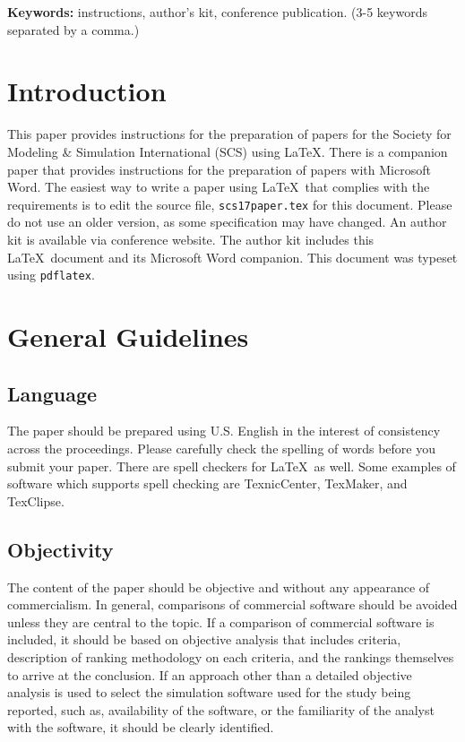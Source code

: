 \documentclass{scspaperproc}
\theoremstyle{scsthe}
\begin{document}
\textbf{Keywords:} instructions, author’s kit, conference publication. (3-5 keywords separated by a comma.)

\section{Introduction}
\label{sec:intro}

This paper provides instructions for the preparation of papers for the Society for Modeling \& Simulation International (SCS) using \LaTeX. There is a companion paper that provides instructions for the preparation of papers with Microsoft Word. The easiest way to write a paper using \LaTeX\ that complies with the requirements is to edit the source file, \texttt{scs17paper.tex} for this document. Please do not use an older version, as some specification may have changed. An author kit is available via conference website. The author kit includes this \LaTeX\ document and its Microsoft Word companion. This document was typeset using \texttt{pdflatex}.


\section{General Guidelines}

\subsection{Language}

The paper should be prepared using U.S. English in the interest of consistency across the proceedings. Please carefully check the spelling of words before you submit your paper. There are spell checkers for \LaTeX\ as well.
Some examples of software which supports spell checking are TexnicCenter, TexMaker, and TexClipse.

\subsection{Objectivity}
The content of the paper should be objective and without any appearance of commercialism.  In general, comparisons of commercial software should be avoided unless they are central to the topic.  If a comparison of commercial software is included, it should be based on objective analysis that includes criteria, description of ranking methodology on each criteria, and the rankings themselves to arrive at the conclusion.
If an approach other than a detailed objective analysis is used to select the simulation software used for the study being reported, such as, availability of the software, or the familiarity of the analyst with the software, it should be clearly identified.
\end{document}
